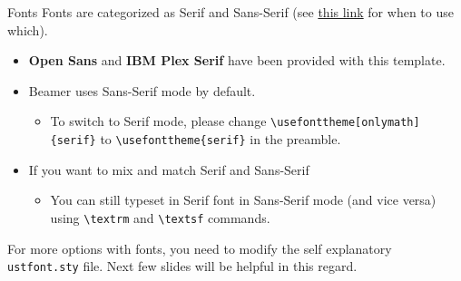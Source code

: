 \documentclass[]{beamer}
\newcommand{\hrefcol}[2]{\textcolor{uihteal}{\href{#1}{#2}}}
\begin{document}


\begin{frame}[fragile]{Fonts}
Fonts are categorized as \textrm{Serif} and \textsf{Sans-Serif} (see \hrefcol{https://www.adobe.com/creativecloud/design/discover/serif-vs-sans-serif.html}{this link} for when to use which).

\begin{itemize}
    \item \textbf{\textsf{Open Sans}} and \textbf{\textrm{IBM Plex Serif}} have been provided with this template.
    \item Beamer uses \textsf{Sans-Serif} mode by default.
    \begin{itemize}
        \item To switch to Serif mode, please change \verb|\usefonttheme[onlymath]{serif}| to \verb|\usefonttheme{serif}| in the preamble.
    \end{itemize}
    \item If you want to mix and match Serif and Sans-Serif
    \begin{itemize}
        \item You can still typeset in Serif font in Sans-Serif mode (and vice versa) using \verb|\textrm| and \verb|\textsf| commands.
    \end{itemize}
\end{itemize}
For more options with fonts, you need to modify the self explanatory \verb|ustfont.sty| file. Next few slides will be helpful in this regard.
\end{frame}
\end{document}
